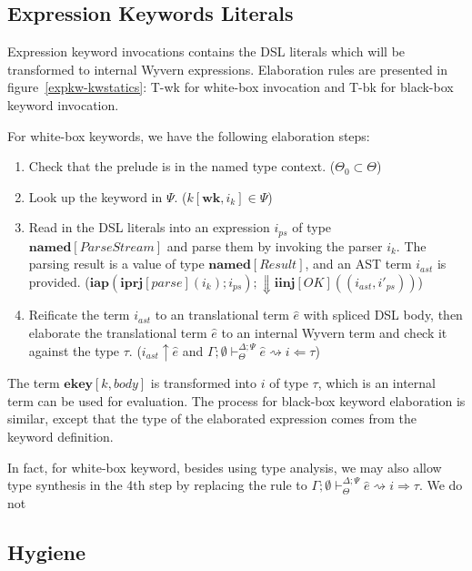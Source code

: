 \documentclass{sig-alternate}
\newcommand{\myvdash}{\vdash_{\Theta}^{\Delta;\Psi}}
\begin{document}


\subsection{Expression Keywords Literals}
Expression keyword invocations contains the DSL literals which will be transformed to internal Wyvern expressions. Elaboration rules are presented in figure~\ref{expkw-kwstatics}: T-wk for white-box invocation and T-bk for black-box keyword invocation.

For white-box keywords, we have the following elaboration steps:
\begin{enumerate}\setlength{\itemsep}{0pt}
\item Check that the prelude is in the named type context. ($\Theta_0\subset\Theta$)
\item Look up the keyword in $\Psi$. ($k[\mathbf{wk},i_k]\in\Psi$)
\item Read in the DSL literals into an expression $i_{ps}$ of type $\mathbf{named}[ParseStream]$ and parse them by invoking the parser $i_k$. The parsing result is a value of type $\mathbf{named}[Result]$, and an AST term $i_{ast}$ is provided. ($\mathbf{iap}(\mathbf{iprj}[parse](i_k); i_{ps});\Downarrow \mathbf{iinj}[OK]((i_{ast}, i'_{ps}))$)
\item Reificate the term $i_{ast}$ to an translational term $\hat{e}$ with spliced DSL body, then elaborate the translational term $\hat{e}$ to an internal Wyvern term and check it against the type $\tau$. ($i_{ast}\uparrow \hat{e}$ and $\Gamma;\emptyset\myvdash \hat{e} \rightsquigarrow i \Leftarrow \tau$)
\end{enumerate}
The term $\mathbf{ekey}[k,body]$ is transformed into $i$ of type $\tau$, which is an internal term can be used for evaluation. The process for black-box keyword elaboration is similar, except that the type of the elaborated expression comes from the keyword definition. 

In fact, for white-box keyword, besides using type analysis, we may also allow type synthesis in the 4th step by replacing the rule to  $\Gamma;\emptyset\myvdash \hat{e} \rightsquigarrow i \Rightarrow \tau$. We do not  



\subsection{Hygiene}
\end{document}
